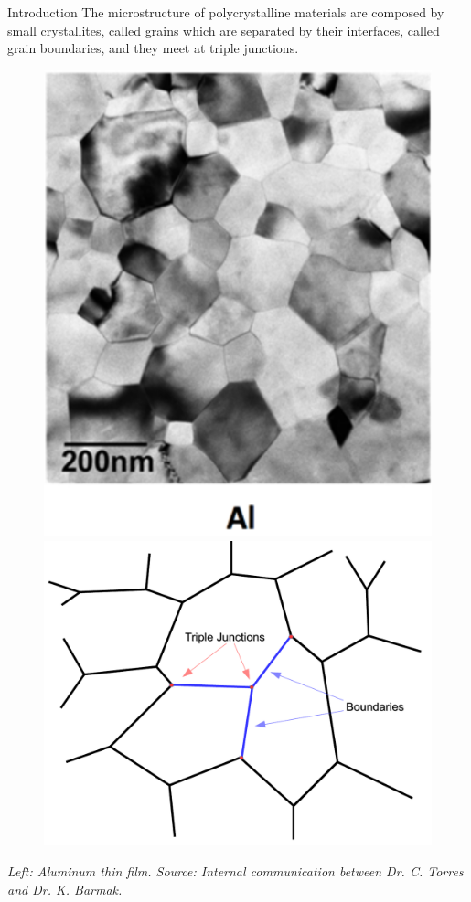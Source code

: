 \documentclass[usenames,dvipsnames]{beamer}
\begin{document}
\begin{frame}{Introduction}
    The microstructure of polycrystalline materials are composed by small crystallites, called grains which are separated by their interfaces, called grain boundaries, and they meet at triple junctions.

    \begin{figure}
        \centering
        \includegraphics[scale=0.25, valign=t]{figures/extras/aluminum.png}\hspace{2em}
        \includegraphics[scale=0.27,valign=t]{figures/extras/scheme.pdf}
    \end{figure}
    {\tiny \emph{Left: Aluminum thin film. Source: Internal communication between Dr. C. Torres and Dr. K. Barmak.}}
\end{frame}
\end{document}

